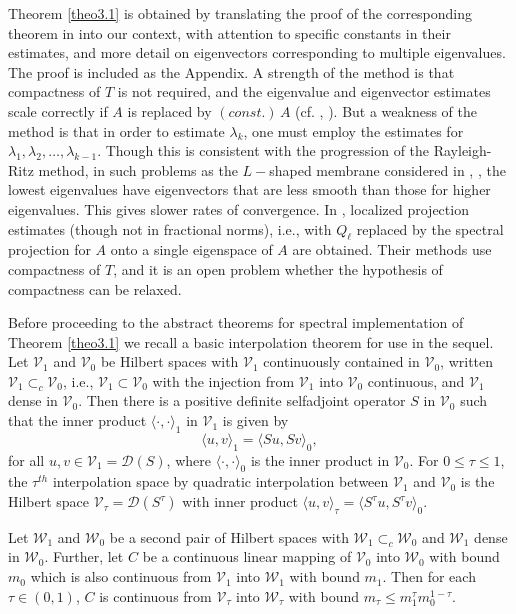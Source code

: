 \documentclass[final]{siamltex}
\numberwithin{equation}{section}
\begin{document}
Theorem \ref{theo3.1} is obtained by translating the proof of the corresponding theorem in \cite{Strang-Fix} into our context, with attention to specific constants in their estimates, and more detail on eigenvectors corresponding to multiple eigenvalues. The proof is included as the Appendix. A strength of the method is that compactness of $T$ is not required, and the eigenvalue and eigenvector estimates scale correctly if $A$ is replaced by $(const.) \, A$ (cf. \cite{Strang-Fix}, \cite{Todor}). But a weakness of the method is that in order to estimate $\lambda_k$, one must employ the estimates for $\lambda_1, \lambda_2, \ldots, \lambda_{k-1}$. Though this is consistent with the progression of the Rayleigh-Ritz method, in such problems as the $L-$shaped membrane considered in \cite{Babuska-Osborn}, \cite{Strang-Fix}, the lowest eigenvalues have eigenvectors that are less smooth than those for higher eigenvalues. This gives slower rates of convergence. In \cite{Babuska-Osborn}, \cite{Chatelin} localized projection estimates (though not in fractional norms), i.e., with $Q_{\ell}$ replaced by the spectral projection for $A$ onto a single eigenspace of $A$ are obtained. Their methods use compactness of $T$, and it is an open problem whether the hypothesis of compactness can be relaxed.

Before proceeding to the abstract theorems for spectral implementation of Theorem \ref{theo3.1} we recall a basic interpolation theorem for use in the sequel.
Let $\mathcal{V}_1$ and $\mathcal{V}_0$
be Hilbert spaces with $\mathcal{V}_1$ continuously contained in
$\mathcal{V}_0$, written $\mathcal{V}_1 \subset_{c} \mathcal{V}_0$,
i.e., $\mathcal{V}_1 \subset \mathcal{V}_0$ with
the injection from $\mathcal{V}_1$ into $\mathcal{V}_0$
continuous, and $\mathcal{V}_1$ dense in $\mathcal{V}_0$. Then
there is a positive definite selfadjoint operator $S$ in
$\mathcal{V}_0$ such that the inner product $\langle \cdot , \cdot
\rangle_1$ in $\mathcal{V}_1$ is given by
\[\langle u , v \rangle_1 = \langle S u , S v \rangle_0, \]
for all $u, v \in \mathcal{V}_1=\mathcal{D}(S)$, where $\langle
\cdot , \cdot \rangle_0$ is the inner product in $\mathcal{V}_0$.
For $0\le \tau \le 1$, the $\tau^{th}$ interpolation space by
quadratic interpolation between $\mathcal{V}_1$ and
$\mathcal{V}_0$ is the Hilbert space $\mathcal{V}_{\tau}=
\mathcal{D}(S^{\tau})$ with inner product $\langle u , v
\rangle_{\tau} = \langle S^{\tau} u , S^{\tau} v \rangle_0$.

\begin{proposition} \label{prop4.1} Let $\mathcal{W}_1$ and
$\mathcal{W}_0$ be a second pair of Hilbert spaces with
$\mathcal{W}_1 \subset_{c} \mathcal{W}_0$  and $\mathcal{W}_1$ dense in $\mathcal{W}_0$. Further, let $C$ be a continuous linear mapping of
$\mathcal{V}_0$ into $\mathcal{W}_0$ with bound $m_0$ which is
also continuous from $\mathcal{V}_1$ into $\mathcal{W}_1$ with
bound $m_1$. Then for each $\tau \in (0,1)$, $C$ is continuous
from $\mathcal{V}_{\tau}$ into $\mathcal{W}_{\tau}$ with bound
$m_{\tau} \le m_1^{\tau} m_0^{1-\tau}$.
\end{proposition}
\end{document}

